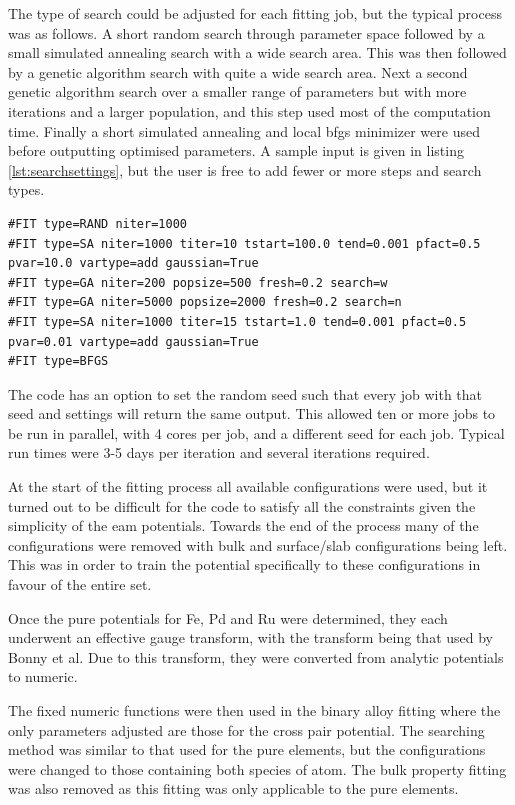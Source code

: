 The type of search could be adjusted for each fitting job, but the typical process was as follows.  A short random search through parameter space followed by a small simulated annealing search with a wide search area.  This was then followed by a genetic algorithm search with quite a wide search area.  Next a second genetic algorithm search over a smaller range of parameters but with more iterations and a larger population, and this step used most of the computation time.  Finally a short simulated annealing and local \acrshort{bfgs} minimizer were used before outputting optimised parameters.  A sample input is given in listing \ref{lst:searchsettings}, but the user is free to add fewer or more steps and search types.

\begin{lstlisting}[style=sEmail,caption={Parameter search settings when fitting in EAMPA}, label={lst:searchsettings}]
#FIT type=RAND niter=1000 
#FIT type=SA niter=1000 titer=10 tstart=100.0 tend=0.001 pfact=0.5 pvar=10.0 vartype=add gaussian=True
#FIT type=GA niter=200 popsize=500 fresh=0.2 search=w
#FIT type=GA niter=5000 popsize=2000 fresh=0.2 search=n
#FIT type=SA niter=1000 titer=15 tstart=1.0 tend=0.001 pfact=0.5 pvar=0.01 vartype=add gaussian=True
#FIT type=BFGS
\end{lstlisting}

The code has an option to set the random seed such that every job with that seed and settings will return the same output.  This allowed ten or more jobs to be run in parallel, with 4 cores per job, and a different seed for each job.  Typical run times were 3-5 days per iteration and several iterations required.

At the start of the fitting process all available configurations were used, but it turned out to be difficult for the code to satisfy all the constraints given the simplicity of the \acrshort{eam} potentials.  Towards the end of the process many of the configurations were removed with bulk and surface/slab configurations being left.  This was in order to train the potential specifically to these configurations in favour of the entire set.  

Once the pure potentials for Fe, Pd and Ru were determined, they each underwent an effective gauge transform, with the transform being that used by Bonny et al\cite{bonnyfecr}\cite{bonnymalerba}.  Due to this transform, they were converted from analytic potentials to numeric.  

The fixed numeric functions were then used in the binary alloy fitting where the only parameters adjusted are those for the cross pair potential.  The searching method was similar to that used for the pure elements, but the configurations were changed to those containing both species of atom.  The bulk property fitting was also removed as this fitting was only applicable to the pure elements.



